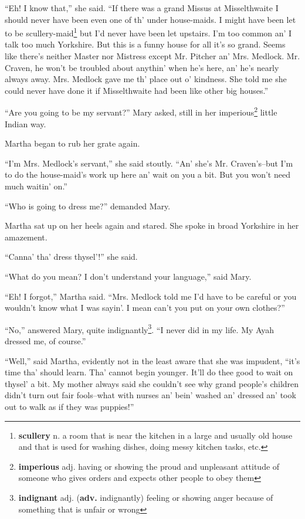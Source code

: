 ``Eh! I know that,'' she said. ``If there was a grand Missus at Misselthwaite I should never have been even one of th' under house-maids. I might have been let to be scullery-maid\footnote{\textbf{scullery} n. a room that is near the kitchen in a large and usually old house and that is used for washing dishes, doing messy kitchen tasks, etc.} but I'd never have been let upstairs. I'm too common an' I talk too much Yorkshire. But this is a funny house for all it's so grand. Seems like there's neither Master nor Mistress except Mr. Pitcher an' Mrs. Medlock. Mr. Craven, he won't be troubled about anythin' when he's here, an' he's nearly always away. Mrs. Medlock gave me th' place out o' kindness. She told me she could never have done it if Misselthwaite had been like other big houses.''

``Are you going to be my servant?'' Mary asked, still in her imperious\footnote{\textbf{imperious} adj. having or showing the proud and unpleasant attitude of someone who gives orders and expects other people to obey them} little Indian way.

Martha began to rub her grate again.

``I'm Mrs. Medlock's servant,'' she said stoutly. ``An' she's Mr. Craven's--but I'm to do the house-maid's work up here an' wait on you a bit. But you won't need much waitin' on.''

``Who is going to dress me?'' demanded Mary.

Martha sat up on her heels again and stared. She spoke in broad Yorkshire in her amazement.

``Canna' tha' dress thysel'!'' she said.

``What do you mean? I don't understand your language,'' said Mary.

``Eh! I forgot,'' Martha said. ``Mrs. Medlock told me I'd have to be careful or you wouldn't know what I was sayin'. I mean can't you put on your own clothes?''

``No,'' answered Mary, quite indignantly\footnote{\textbf{indignant} adj. (\textbf{adv.} indignantly) feeling or showing anger because of something that is unfair or wrong}. ``I never did in my life. My Ayah dressed me, of course.''

``Well,'' said Martha, evidently not in the least aware that she was impudent, ``it's time tha' should learn. Tha' cannot begin younger. It'll do thee good to wait on thysel' a bit. My mother always said she couldn't see why grand people's children didn't turn out fair fools--what with nurses an' bein' washed an' dressed an' took out to walk as if they was puppies!''

